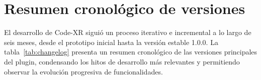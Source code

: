 \documentclass[a4paper, 12pt]{book}
\begin{document}




\section{Resumen cronológico de versiones}
\label{sec:resumen-versiones}
El desarrollo de Code-XR siguió un proceso iterativo e incremental a lo largo de seis meses, desde el prototipo inicial hasta la versión estable 1.0.0. La tabla~\ref{tab:changelog} presenta un resumen cronológico de las versiones principales del plugin, condensando los hitos de desarrollo más relevantes y permitiendo observar la evolución progresiva de funcionalidades.
\end{document}
